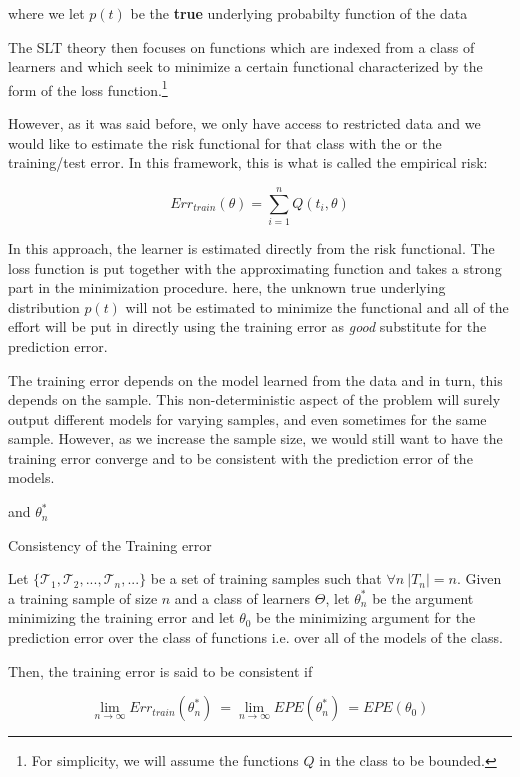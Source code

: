where we let $p(t)$ be the \textbf{true} underlying probabilty function of the data

The SLT theory then focuses on functions which are indexed from a class of learners and which seek to minimize a certain functional characterized by the form of the loss function.\footnote{For simplicity, we will assume the functions $Q$ in the class to be bounded.} 

However, as it was said before, we only have access to restricted data and we would like to estimate the risk functional for that class with the or the training/test error. In this framework, this is what is called the empirical risk:

\begin{equation}\label{vapnik-empiricalRisk}
Err_{train}(\theta) =  \sum_{i=1}^n Q(t_i,\theta) 
\end{equation}

In this approach, the learner is estimated directly from the risk functional. The loss function is put together with the approximating function and takes a strong part in the minimization procedure. 
here, the unknown true underlying distribution $p(t)$ will not be estimated to minimize the functional and all of the effort will be put in directly using the training error as \textit{good} substitute for the prediction error.


The training error depends on the model learned from the data and in turn, this depends on the sample.
This non-deterministic aspect of the problem will surely output different models for varying samples, and even sometimes for the same sample. However, as we increase the sample size, we would still want to have the training error converge and to be consistent with the prediction error of the models.



and $\theta^{*}_n$


\begin{definition}{Consistency of the Training error}
	
	Let $\{\mathcal {T}_1, \mathcal {T}_2, ..., \mathcal {T}_n, ...  \}$ be a set of training samples such that $\forall n \ |T_n|=n$. Given a training sample of size $n$ and a class of learners $\Theta$, let $\theta^{*}_n$ be the argument minimizing the training error and let $\theta_0$ be the minimizing argument for the prediction error over the class of functions i.e. over all of the models of the class.
	
	Then, the training error is said to be consistent if 
	
	$$\lim_{n\to\infty} Err_{train}(\theta^{*}_n) \  = \lim_{n\to\infty} EPE(\theta^{*}_n) \ =  EPE(\theta_0)$$

\end{definition}

